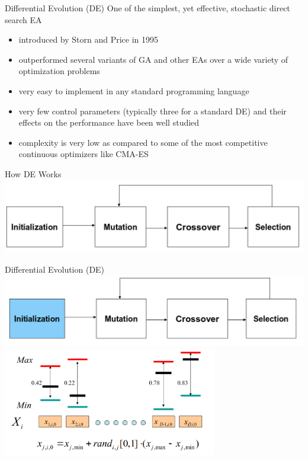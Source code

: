 \begin{frame}{Differential Evolution (DE) }
One of the simplest, yet effective, stochastic direct search EA
\begin{itemize}
    \item introduced by Storn and Price in 1995
    \item outperformed several variants of GA and other EAs over a wide variety of optimization problems
    \item very easy to implement in any standard programming language
    \item very few control parameters (typically three for a standard DE) and their effects on the performance have been well studied
    \item complexity is very low as  compared to some of the most competitive continuous optimizers like CMA-ES
\end{itemize}
\end{frame}

\begin{frame}{How DE Works}
\centering
\includegraphics[width=1.0\textwidth]{new_images/DE1.png}\\
\end{frame}

\begin{frame}{Differential Evolution (DE)}
\centering
\includegraphics[width=1.0\textwidth]{new_images/DE2.png}\\
\includegraphics[width=0.7\textwidth]{new_images/DE3.png}\\
\end{frame}

